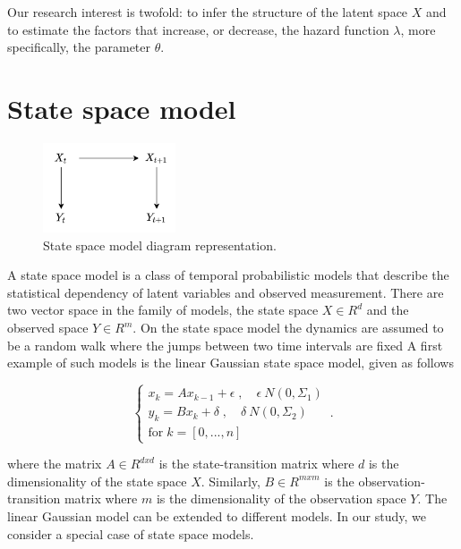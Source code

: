 \documentclass[mscthesis]{usiinfthesis}
\begin{document}
Our research interest is twofold: to infer the structure of the latent space $X$ and to estimate the factors that increase, or decrease, the hazard function $\lambda$, more specifically, the parameter $\theta$.


\section{State space model}
\label{sec:latent_space}

\begin{figure}[H]
    \centering
    \includegraphics[width=0.35\textwidth]{statespace_diagram.png}
    \caption{State space model diagram representation.}
    \label{fig:pdf_invasion}
\end{figure}


A state space model is a class of temporal probabilistic models that describe the statistical dependency of latent variables and observed measurement. There are two vector space in the family of models, the state space $X \in R^d$ and the observed space $Y \in R^m$. On the state space model the dynamics are assumed to be a random walk where the jumps between two time intervals are fixed A first example of such models is the linear Gaussian state space model, given as follows

\begin{eqfloat}
\begin{equation}
    \begin{cases}
      x_k = A x_{k-1} + \epsilon \; , \quad \epsilon ~ N(0, \Sigma_1) \\
      y_k = B x_k + \delta  \; , \quad \delta ~ N(0, \Sigma_2)  \\
      \textrm{for} \; k = [0, ..., n]
    \end{cases}\,.
\label{eq:statespace}
\end{equation}
\caption{State space model}
\end{eqfloat}

where the matrix $A \in R^{dxd}$ is the state-transition matrix where $d$ is the dimensionality of the state space $X$. Similarly, $B \in R^{mxm}$ is the observation-transition matrix where $m$ is the dimensionality of the observation space $Y$. The linear Gaussian model can be extended to different models. In our study, we consider a special case of state space models.
\end{document}
